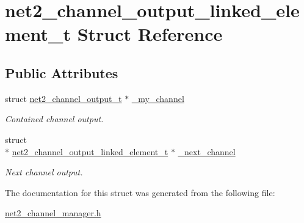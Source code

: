\hypertarget{structnet2__channel__output__linked__element__t}{\section{net2\-\_\-channel\-\_\-output\-\_\-linked\-\_\-element\-\_\-t Struct Reference}
\label{structnet2__channel__output__linked__element__t}
}
\subsection*{Public Attributes}
\begin{DoxyCompactItemize}
\item 
\hypertarget{structnet2__channel__output__linked__element__t_a343a53b3f9c63bb64b2d478421aae3cf}{struct \hyperlink{structnet2__channel__output__t}{net2\-\_\-channel\-\_\-output\-\_\-t} $\ast$ \hyperlink{structnet2__channel__output__linked__element__t_a343a53b3f9c63bb64b2d478421aae3cf}{\-\_\-my\-\_\-channel}}\label{structnet2__channel__output__linked__element__t_a343a53b3f9c63bb64b2d478421aae3cf}

\begin{DoxyCompactList}\small\item\em Contained channel output. \end{DoxyCompactList}\item 
\hypertarget{structnet2__channel__output__linked__element__t_a433cc35e25167e850e0d04c222b75a44}{struct \\*
\hyperlink{structnet2__channel__output__linked__element__t}{net2\-\_\-channel\-\_\-output\-\_\-linked\-\_\-element\-\_\-t} $\ast$ \hyperlink{structnet2__channel__output__linked__element__t_a433cc35e25167e850e0d04c222b75a44}{\-\_\-next\-\_\-channel}}\label{structnet2__channel__output__linked__element__t_a433cc35e25167e850e0d04c222b75a44}

\begin{DoxyCompactList}\small\item\em Next channel output. \end{DoxyCompactList}\end{DoxyCompactItemize}


The documentation for this struct was generated from the following file\-:\begin{DoxyCompactItemize}
\item 
\hyperlink{net2__channel__manager_8h}{net2\-\_\-channel\-\_\-manager.\-h}\end{DoxyCompactItemize}
